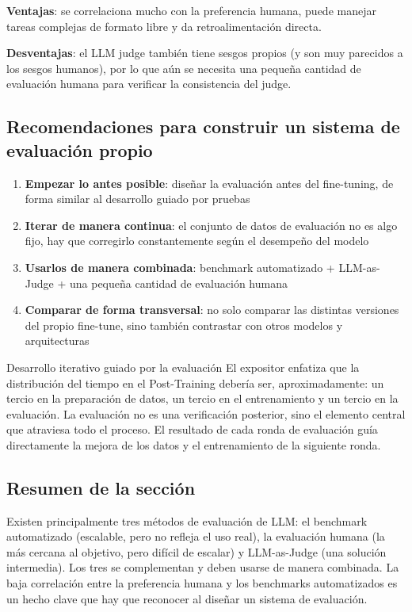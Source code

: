 \textbf{Ventajas}: se correlaciona mucho con la preferencia humana, puede manejar tareas complejas de formato libre y da retroalimentación directa.

\textbf{Desventajas}: el LLM judge también tiene sesgos propios (y son muy parecidos a los sesgos humanos), por lo que aún se necesita una pequeña cantidad de evaluación humana para verificar la consistencia del judge.

\subsection{Recomendaciones para construir un sistema de evaluación propio}

\begin{enumerate}
    \item \textbf{Empezar lo antes posible}: diseñar la evaluación antes del fine-tuning, de forma similar al desarrollo guiado por pruebas
    \item \textbf{Iterar de manera continua}: el conjunto de datos de evaluación no es algo fijo, hay que corregirlo constantemente según el desempeño del modelo
    \item \textbf{Usarlos de manera combinada}: benchmark automatizado + LLM-as-Judge + una pequeña cantidad de evaluación humana
    \item \textbf{Comparar de forma transversal}: no solo comparar las distintas versiones del propio fine-tune, sino también contrastar con otros modelos y arquitecturas
\end{enumerate}

\begin{knowledgebox}{Desarrollo iterativo guiado por la evaluación}
El expositor enfatiza que la distribución del tiempo en el Post-Training debería ser, aproximadamente: un tercio en la preparación de datos, un tercio en el entrenamiento y un tercio en la evaluación. La evaluación no es una verificación posterior, sino el elemento central que atraviesa todo el proceso. El resultado de cada ronda de evaluación guía directamente la mejora de los datos y el entrenamiento de la siguiente ronda.
\end{knowledgebox}

\subsection{Resumen de la sección}

Existen principalmente tres métodos de evaluación de LLM: el benchmark automatizado (escalable, pero no refleja el uso real), la evaluación humana (la más cercana al objetivo, pero difícil de escalar) y LLM-as-Judge (una solución intermedia). Los tres se complementan y deben usarse de manera combinada. La baja correlación entre la preferencia humana y los benchmarks automatizados es un hecho clave que hay que reconocer al diseñar un sistema de evaluación.

\newpage
